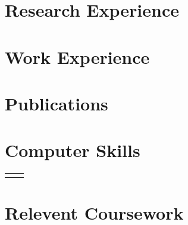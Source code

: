 \documentclass[10pt]{article} %
\begin{document}
\begin{paracol}{2}



\medskip
\section{Research Experience}






\medskip
\section{Work Experience}




\switchcolumn
\medskip
\section{Publications}



\medskip
\section{Computer Skills} 

\begin{supertabular}{rl}
	
	

	
\end{supertabular}


\medskip
\section{Relevent Coursework}


\end{paracol}
\end{document}
